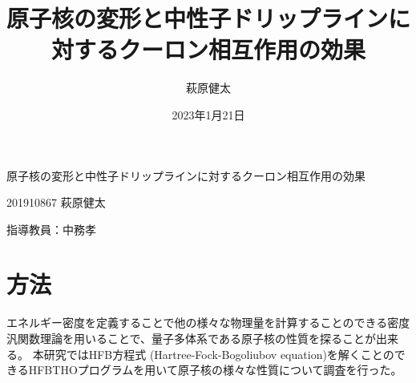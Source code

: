 \documentclass[12pt]{jarticle}
\title{原子核の変形と中性子ドリップラインに対するクーロン相互作用の効果}
\author{萩原健太}
\date{2023年1月21日}
\begin{document}
\begin{center}
    {\Large
        原子核の変形と中性子ドリップラインに対するクーロン相互作用の効果
    }
\end{center}
\vspace{1em}
\begin{flushright}
  201910867 萩原健太

  指導教員：中務孝
\end{flushright}


\section{方法}
%
エネルギー密度を定義することで他の様々な物理量を計算することのできる密度汎関数理論を用いることで、量子多体系である原子核の性質を探ることが出来る。
本研究ではHFB方程式 (Hartree-Fock-Bogoliubov equation)を解くことのできるHFBTHOプログラムを用いて原子核の様々な性質について調査を行った。
\end{document}
